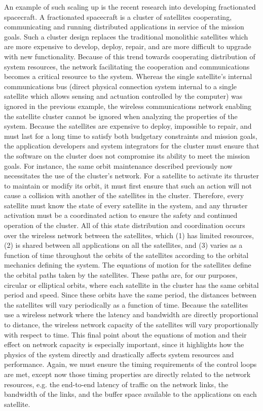 An example of such scaling up is the recent research into developing
fractionated spacecraft\cite{fractionated_spacecraft}.  A fractionated
spacecraft is a cluster of satellites cooperating, communicating and
running distributed applications in service of the mission goals.
Such a cluster design replaces the traditional monolithic satellites
which are more expensive to develop, deploy, repair, and are more
difficult to upgrade with new functionality.  Because of this trend
towards cooperating distribution of system resources, the network
facilitating the cooperation and communications becomes a critical
resource to the system.  Whereas the single satellite's internal
communications bus (direct physical connection system internal to a
single satellite which allows sensing and actuation controlled by the
computer) was ignored in the previous example, the wireless
communications network enabling the satellite cluster cannot be
ignored when analyzing the properties of the system.  Because the
satellites are expensive to deploy, impossible to repair, and must
last for a long time to satisfy both budgetary constraints and mission
goals, the application developers and system integrators for the
cluster must ensure that the software on the cluster does not
compromise its ability to meet the mission goals.  For instance, the
same orbit maintenance described previously now necessitates the use
of the cluster's network.  For a satellite to activate its thruster to
maintain or modify its orbit, it must first ensure that such an action
will not cause a collision with another of the satellites in the
cluster.  Therefore, every satellite must know the state of every
satellite in the system, and any thruster activation must be a
coordinated action to ensure the safety and continued operation of the
cluster.  All of this state distribution and coordination occurs over
the wireless network between the satellites, which (1) has limited
resources, (2) is shared between all applications on all the
satellites, and (3) varies as a function of time throughout the orbits
of the satellites according to the orbital mechanics defining the
system.  The equations of motion for the satellites define the orbital
paths taken by the satellites\cite{fundamentals_astrodynamics}.  These
paths are, for our purposes, circular or elliptical orbits, where each
satellite in the cluster has the same orbital period and speed.  Since
these orbits have the same period, the distances between the
satellites will vary periodically as a function of time.  Because the
satellites use a wireless network where the latency and bandwidth are
directly proportional to distance, the wireless network capacity of
the satellites will vary proportionally with respect to time.  This
final point about the equations of motion and their effect on network
capacity is especially important, since it highlights how the physics
of the system directly and drastically affects system resources and
performance.  Again, we must ensure the timing requirements of the
control loops are met, except now those timing properties are directly
related to the network resources, e.g. the end-to-end latency of
traffic on the network links, the bandwidth of the links, and the
buffer space available to the applications on each satellite.


